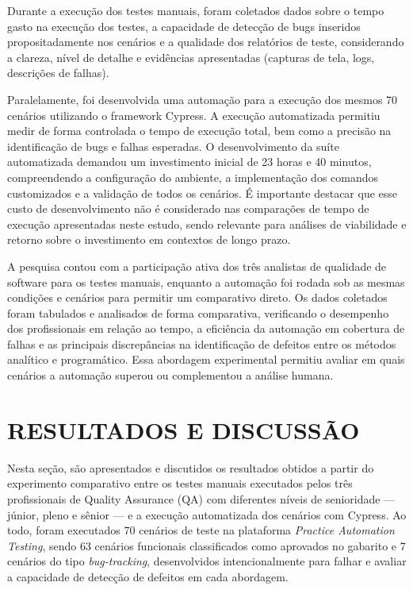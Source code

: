 \documentclass{UNESC}
\begin{document}
Durante a execução dos testes manuais, foram coletados dados sobre o tempo gasto na execução dos testes, a capacidade de detecção de bugs inseridos propositadamente nos cenários e a qualidade dos relatórios de teste, considerando a clareza, nível de detalhe e evidências apresentadas (capturas de tela, logs, descrições de falhas).

Paralelamente, foi desenvolvida uma automação para a execução dos mesmos 70 cenários utilizando o framework Cypress. A execução automatizada permitiu medir de forma controlada o tempo de execução total, bem como a precisão na identificação de bugs e falhas esperadas. O desenvolvimento da suíte automatizada demandou um investimento inicial de 23 horas e 40 minutos, compreendendo a configuração do ambiente, a implementação dos comandos customizados e a validação de todos os cenários. É importante destacar que esse custo de desenvolvimento não é considerado nas comparações de tempo de execução apresentadas neste estudo, sendo relevante para análises de viabilidade e retorno sobre o investimento em contextos de longo prazo. 

A pesquisa contou com a participação ativa dos três analistas de qualidade de software para os testes manuais, enquanto a automação foi rodada sob as mesmas condições e cenários para permitir um comparativo direto. Os dados coletados foram tabulados e analisados de forma comparativa, verificando o desempenho dos profissionais em relação ao tempo, a eficiência da automação em cobertura de falhas e as principais discrepâncias na identificação de defeitos entre os métodos analítico e programático. Essa abordagem experimental permitiu avaliar em quais cenários a automação superou ou complementou a análise humana.

\section{RESULTADOS E DISCUSSÃO}
Nesta seção, são apresentados e discutidos os resultados obtidos a partir do experimento comparativo entre os testes manuais executados pelos três profissionais de Quality Assurance (QA) com diferentes níveis de senioridade — júnior, pleno e sênior — e a execução automatizada dos cenários com Cypress. Ao todo, foram executados 70 cenários de teste na plataforma \textit{Practice Automation Testing}, sendo 63 cenários funcionais classificados como aprovados no gabarito e 7 cenários do tipo \textit{bug-tracking}, desenvolvidos intencionalmente para falhar e avaliar a capacidade de detecção de defeitos em cada abordagem.
\end{document}
